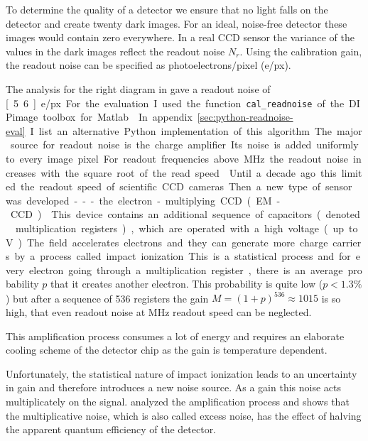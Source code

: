 To determine the quality of a detector we 
ensure that no light falls on the detector and create twenty dark
images.  For an ideal, noise-free detector these images would contain
zero everywhere. In a real CCD sensor the variance of the values in
the dark images reflect the readout noise $N_r$. Using the calibration
gain, the readout noise can be specified as photoelectrons$/$pixel
(\unit[]{e/px}).

The analysis for the right diagram in  gave a
readout noise of \unit[5.6]{e/px}. For the evaluation I used the
function \verb!cal_readnoise! of the DIPimage toolbox for Matlab
\citep{Lidke2005a}. In appendix \ref{sec:python-readnoise-eval} I list
an alternative Python implementation of this algorithm.

The major source for readout noise is the charge amplifier. Its noise is
added uniformly to every image pixel. For readout frequencies above
\unit[1]{MHz} the readout noise increases with the square root of the
read speed \citep{Pawley2006}. Until a decade ago this limited the
readout speed of scientific CCD cameras. Then a new type of sensor was
developed --- the electron-multiplying CCD (EM-CCD) \citep{Mackay}.

This device contains an additional sequence of capacitors (denoted        
multiplication registers), which are operated with a high voltage (up
to \unit[46]{V}). The field accelerates electrons and they can
generate more charge carriers by a process called impact
ionization. This is a statistical process and for every electron going
through a multiplication register, there is an average probability $p$
that it creates another electron. This probability is quite low
($p<1.3\%$) but after a sequence of 536 registers the gain
$M=(1+p)^{536}\approx 1015$ is so high, that even readout noise at \unit[17]{MHz}
readout speed can be neglected.

This amplification process consumes a lot of energy and requires an
elaborate cooling scheme of the detector chip as the gain is
temperature dependent.

Unfortunately, the statistical nature of impact ionization leads to an
uncertainty in gain and therefore introduces a  new noise source. As a gain this noise
acts multiplicately on the signal. \cite{Robbins2003} analyzed the
amplification process and shows that the multiplicative noise, which
is also called excess noise, has the effect of halving the apparent
quantum efficiency of the detector.

